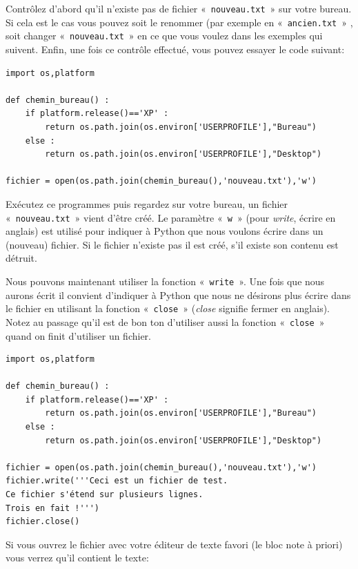 Contrôlez d'abord qu'il n'existe pas de fichier «~\texttt{nouveau.txt}~» sur votre bureau. Si cela est le cas vous pouvez soit le renommer (par exemple en «~\texttt{ancien.txt}~» , soit changer «~\texttt{nouveau.txt}~» en ce que vous voulez dans les exemples qui suivent. Enfin, une fois ce contrôle effectué, vous pouvez essayer le code suivant:

\begin{Verbatim}[frame=single,rulecolor=\color{mbleu}, label=à taper par exemple en reprenant l'existant]
import os,platform

def chemin_bureau() :
    if platform.release()=='XP' :
        return os.path.join(os.environ['USERPROFILE'],"Bureau")
    else :
        return os.path.join(os.environ['USERPROFILE'],"Desktop")
    
fichier = open(os.path.join(chemin_bureau(),'nouveau.txt'),'w')
\end{Verbatim}

Exécutez ce programmes puis regardez sur votre bureau, un fichier «~\texttt{nouveau.txt}~» vient d'être créé. Le paramètre «~\texttt{w}~» (pour \emph{write}, écrire en anglais) est utilisé pour indiquer à Python que nous voulons écrire dans un (nouveau) fichier. Si le fichier n'existe pas il est créé, s'il existe son contenu est détruit.

Nous pouvons maintenant utiliser la fonction «~\texttt{write}~». Une fois que nous aurons écrit il convient d'indiquer à Python que nous ne désirons plus écrire dans le fichier en utilisant la fonction «~\texttt{close}~» (\emph{close} signifie fermer en anglais). Notez au passage qu'il est de bon ton d'utiliser aussi la fonction «~\texttt{close}~» quand on finit d'utiliser un fichier.
 
\begin{Verbatim}[frame=single,rulecolor=\color{mbleu}, label=à taper par exemple en reprenant l'existant]
import os,platform

def chemin_bureau() :
    if platform.release()=='XP' :
        return os.path.join(os.environ['USERPROFILE'],"Bureau")
    else :
        return os.path.join(os.environ['USERPROFILE'],"Desktop")
    
fichier = open(os.path.join(chemin_bureau(),'nouveau.txt'),'w')
fichier.write('''Ceci est un fichier de test.
Ce fichier s'étend sur plusieurs lignes.
Trois en fait !''')
fichier.close()
\end{Verbatim}

Si vous ouvrez le fichier avec votre éditeur de texte favori (le bloc note à priori) vous verrez qu'il contient le texte:

